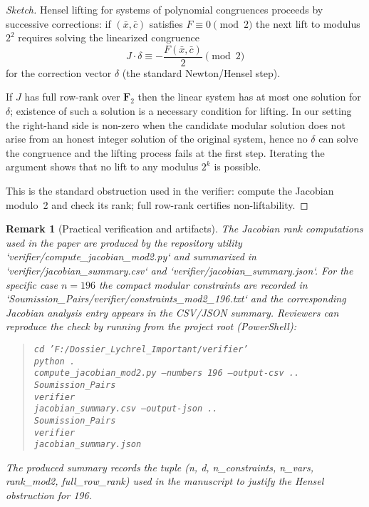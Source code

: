 \documentclass[12pt,a4paper]{article}
\newtheorem{remark}[theorem]{Remark}
\begin{document}
\begin{proof}[Sketch]
Hensel lifting for systems of polynomial congruences proceeds by successive
corrections: if $(\bar x,\bar c)$ satisfies $F\equiv 0\pmod 2$ the next lift
to modulus $2^2$ requires solving the linearized congruence
$$J\cdot \delta \equiv -\frac{F(\bar x,\bar c)}{2} \pmod 2$$
for the correction vector $\delta$ (the standard Newton/Hensel step).

If $J$ has full row-rank over $\mathbf{F}_2$ then the linear system has at
most one solution for $\delta$; existence of such a solution is a necessary
condition for lifting. In our setting the right-hand side is non-zero when
the candidate modular solution does not arise from an honest integer solution
of the original system, hence no $\delta$ can solve the congruence and the
lifting process fails at the first step. Iterating the argument shows that no
lift to any modulus $2^k$ is possible.

This is the standard obstruction used in the verifier: compute the Jacobian
modulo~2 and check its rank; full row-rank certifies non-liftability.
\end{proof}

\begin{remark}[Practical verification and artifacts]
The Jacobian rank computations used in the paper are produced by the
repository utility `verifier/compute_jacobian_mod2.py` and summarized in
`verifier/jacobian_summary.csv` and `verifier/jacobian_summary.json`.
For the specific case $n=196$ the compact modular constraints are recorded in
`Soumission_Pairs/verifier/constraints_mod2_196.txt` and the corresponding
Jacobian analysis entry appears in the CSV/JSON summary. Reviewers can
reproduce the check by running from the project root (PowerShell):
\begin{quote}\small
		\texttt{cd 'F:/Dossier_Lychrel_Important/verifier'}\\
		\texttt{python .\\compute_jacobian_mod2.py --numbers 196 --output-csv ..\\Soumission_Pairs\\verifier\\jacobian_summary.csv --output-json ..\\Soumission_Pairs\\verifier\\jacobian_summary.json}
\end{quote}
The produced summary records the tuple (n, d, n_constraints, n_vars, rank_mod2,
full_row_rank) used in the manuscript to justify the Hensel obstruction for
196.
\end{remark}
\end{document}
